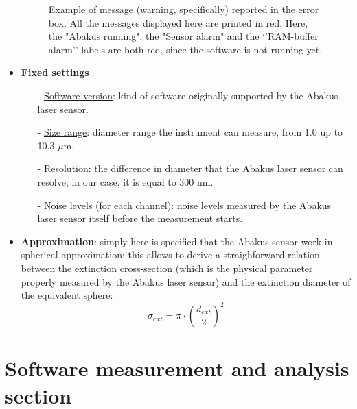 \documentclass[a4paper, 11pt]{report}
\begin{document}
\begin{itemize}
\begin{figure}[!hp]
	\caption{Example of message (warning, specifically) reported in the error box. All the messages displayed here are printed in red. Here, the "Abakus running", the "Sensor alarm" and the `'RAM-buffer alarm'' labels are both red, since the software is not running yet.}
	\label{abakus_software3}
\end{figure}
\newline
\item \textbf{Fixed settings}
\begin{itemize}
\item[-] \underline{Software version}: kind of software originally supported by the Abakus laser sensor.
\item[-] \underline{Size range}: diameter range the instrument can measure, from 1.0 up to 10.3 $\mu$m.
\item[-] \underline{Resolution}: the difference in diameter that the Abakus laser sensor can resolve; in our case, it is equal to 300 nm.
\item[-] \underline{Noise levels (for each channel)}: noise levels measured by the Abakus laser sensor itself before the measurement starts.
\end{itemize}
\item \textbf{Approximation}: simply here is specified that the Abakus sensor work in spherical approximation; this allows to derive a straighforward relation between the extinction cross-section (which is the physical parameter properly measured by the Abakus laser sensor) and the extinction diameter of the equivalent sphere:
\begin{equation*}
\sigma_{ext} = \pi \cdot \left( \dfrac{d_{ext}}{2} \right)^{2}
\end{equation*}
\end{itemize}




\newpage
\section{Software measurement and analysis section}
\label{section_layout}
\end{document}
